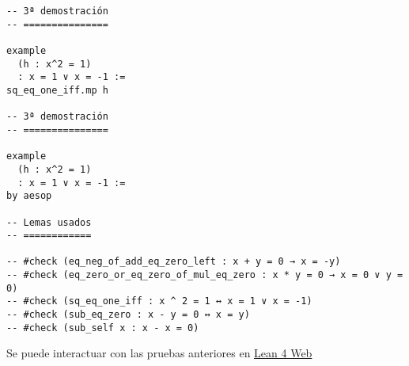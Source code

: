 \begin{verbatim}
-- 3ª demostración
-- ===============

example
  (h : x^2 = 1)
  : x = 1 ∨ x = -1 :=
sq_eq_one_iff.mp h

-- 3ª demostración
-- ===============

example
  (h : x^2 = 1)
  : x = 1 ∨ x = -1 :=
by aesop

-- Lemas usados
-- ============

-- #check (eq_neg_of_add_eq_zero_left : x + y = 0 → x = -y)
-- #check (eq_zero_or_eq_zero_of_mul_eq_zero : x * y = 0 → x = 0 ∨ y = 0)
-- #check (sq_eq_one_iff : x ^ 2 = 1 ↔ x = 1 ∨ x = -1)
-- #check (sub_eq_zero : x - y = 0 ↔ x = y)
-- #check (sub_self x : x - x = 0)
\end{verbatim}
Se puede interactuar con las pruebas anteriores en \href{https://lean.math.hhu.de/\#url=https://raw.githubusercontent.com/jaalonso/Calculemus2/main/src/Cuadrado\_igual\_a\_uno.lean.lean}{Lean 4 Web}

